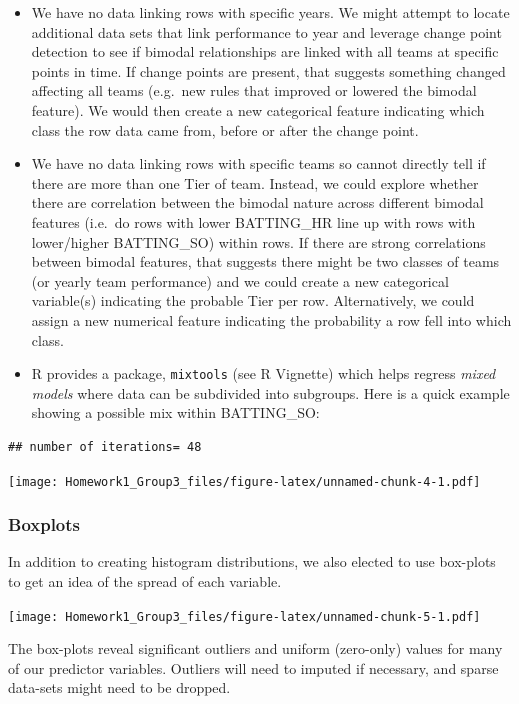 \documentclass[
]{article}
\begin{document}
\begin{itemize}
\item
  We have no data linking rows with specific years. We might attempt to
  locate additional data sets that link performance to year and leverage
  change point detection to see if bimodal relationships are linked with
  all teams at specific points in time. If change points are present,
  that suggests something changed affecting all teams (e.g.~new rules
  that improved or lowered the bimodal feature). We would then create a
  new categorical feature indicating which class the row data came from,
  before or after the change point.
\item
  We have no data linking rows with specific teams so cannot directly
  tell if there are more than one Tier of team. Instead, we could
  explore whether there are correlation between the bimodal nature
  across different bimodal features (i.e.~do rows with lower BATTING\_HR
  line up with rows with lower/higher BATTING\_SO) within rows. If there
  are strong correlations between bimodal features, that suggests there
  might be two classes of teams (or yearly team performance) and we
  could create a new categorical variable(s) indicating the probable
  Tier per row. Alternatively, we could assign a new numerical feature
  indicating the probability a row fell into which class.
\item
  R provides a package, \texttt{mixtools} (see R Vignette) which helps
  regress \emph{mixed models} where data can be subdivided into
  subgroups. Here is a quick example showing a possible mix within
  BATTING\_SO:
\end{itemize}

\begin{verbatim}
## number of iterations= 48
\end{verbatim}

\texttt{[image: Homework1\_Group3\_files/figure-latex/unnamed-chunk-4-1.pdf]}

\hypertarget{boxplots}{%
\subsubsection{Boxplots}\label{boxplots}}

In addition to creating histogram distributions, we also elected to use
box-plots to get an idea of the spread of each variable.

\texttt{[image: Homework1\_Group3\_files/figure-latex/unnamed-chunk-5-1.pdf]}

The box-plots reveal significant outliers and uniform (zero-only) values
for many of our predictor variables. Outliers will need to imputed if
necessary, and sparse data-sets might need to be dropped.
\end{document}
